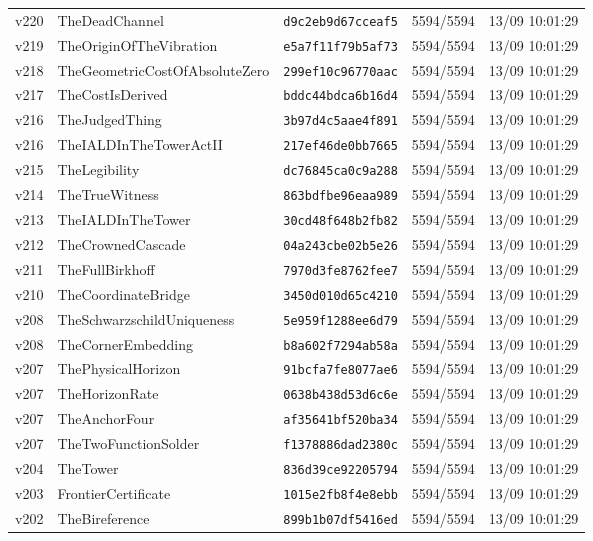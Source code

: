 \documentclass[11pt]{article}
\theoremstyle{definition}\newtheorem{deriv}{Derivação}
\begin{document}
{\begin{longtable}{@{}lllll@{}}
v220 & TheDeadChannel & \texttt{d9c2eb9d67cceaf5} & 5594/5594 & 13/09 10:01:29 \\
v219 & TheOriginOfTheVibration & \texttt{e5a7f11f79b5af73} & 5594/5594 & 13/09 10:01:29 \\
v218 & TheGeometricCostOfAbsoluteZero & \texttt{299ef10c96770aac} & 5594/5594 & 13/09 10:01:29 \\
v217 & TheCostIsDerived & \texttt{bddc44bdca6b16d4} & 5594/5594 & 13/09 10:01:29 \\
v216 & TheJudgedThing & \texttt{3b97d4c5aae4f891} & 5594/5594 & 13/09 10:01:29 \\
v216 & TheIALDInTheTowerActII & \texttt{217ef46de0bb7665} & 5594/5594 & 13/09 10:01:29 \\
v215 & TheLegibility & \texttt{dc76845ca0c9a288} & 5594/5594 & 13/09 10:01:29 \\
v214 & TheTrueWitness & \texttt{863bdfbe96eaa989} & 5594/5594 & 13/09 10:01:29 \\
v213 & TheIALDInTheTower & \texttt{30cd48f648b2fb82} & 5594/5594 & 13/09 10:01:29 \\
v212 & TheCrownedCascade & \texttt{04a243cbe02b5e26} & 5594/5594 & 13/09 10:01:29 \\
v211 & TheFullBirkhoff & \texttt{7970d3fe8762fee7} & 5594/5594 & 13/09 10:01:29 \\
v210 & TheCoordinateBridge & \texttt{3450d010d65c4210} & 5594/5594 & 13/09 10:01:29 \\
v208 & TheSchwarzschildUniqueness & \texttt{5e959f1288ee6d79} & 5594/5594 & 13/09 10:01:29 \\
v208 & TheCornerEmbedding & \texttt{b8a602f7294ab58a} & 5594/5594 & 13/09 10:01:29 \\
v207 & ThePhysicalHorizon & \texttt{91bcfa7fe8077ae6} & 5594/5594 & 13/09 10:01:29 \\
v207 & TheHorizonRate & \texttt{0638b438d53d6c6e} & 5594/5594 & 13/09 10:01:29 \\
v207 & TheAnchorFour & \texttt{af35641bf520ba34} & 5594/5594 & 13/09 10:01:29 \\
v207 & TheTwoFunctionSolder & \texttt{f1378886dad2380c} & 5594/5594 & 13/09 10:01:29 \\
v204 & TheTower & \texttt{836d39ce92205794} & 5594/5594 & 13/09 10:01:29 \\
v203 & FrontierCertificate & \texttt{1015e2fb8f4e8ebb} & 5594/5594 & 13/09 10:01:29 \\
v202 & TheBireference & \texttt{899b1b07df5416ed} & 5594/5594 & 13/09 10:01:29 \\

\end{longtable}}
\end{document}
